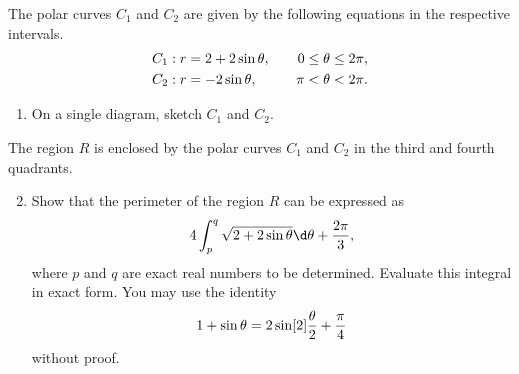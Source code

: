 \begin{problem}
    The polar curves $C_1$ and $C_2$ are given by the following equations in the respective intervals.
    \begin{alignat*}{2}
        C_1: r &= 2 + 2\sin \theta, &\quad 0 \leq \theta \leq 2\pi,\\
        C_2: r &= -2\sin\theta, &\quad \pi < \theta < 2\pi.
    \end{alignat*}

    \begin{enumerate}
        \item On a single diagram, sketch $C_1$ and $C_2$.
    \end{enumerate}

    The region $R$ is enclosed by the polar curves $C_1$ and $C_2$ in the third and fourth quadrants.

    \begin{enumerate}
        \setcounter{enumi}{1}
        \item Show that the perimeter of the region $R$ can be expressed as \[4 \int_p^q \sqrt{2 + 2 \sin \t} \d \t + \frac{2\pi}3,\] where $p$ and $q$ are exact real numbers to be determined. Evaluate this integral in exact form. You may use the identity \[1 + \sin \theta = 2\sin[2]{\frac{\theta}2 + \frac\pi4}\] without proof.
    \end{enumerate}
\end{problem}
